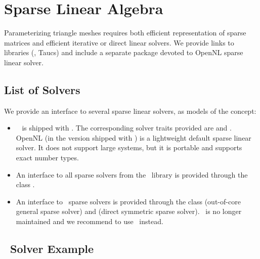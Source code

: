 \section{Sparse Linear Algebra \label{sec:Sparse-Linear-Algebra}}

Parameterizing triangle meshes requires both efficient representation
of sparse matrices and efficient iterative or direct linear
solvers. We provide links to libraries (\eigen, {\sc Taucs})
and include a separate package devoted to OpenNL sparse linear solver.

\subsection{List of Solvers}

We provide an interface to several sparse linear solvers, as models
of the  concept:

\begin{itemize}

\item
    \ccThirdPartyOpenNL\ \cite{cgal:l-nmdgp-05} is shipped with \cgal. The corresponding solver traits
    provided are  and 
    . OpenNL (in the version shipped with \cgal)
    is a lightweight default sparse linear solver. It does not support large systems, but it is portable and
    supports exact number types.

\item
    An interface to all sparse solvers from the \ccThirdPartyEigen\ library is provided through the class
    . 
    


\item
    An interface to \ccThirdPartyTaucs\ sparse solvers is provided through the class 
     (out-of-core general sparse solver) and 
     (direct symmetric sparse solver).
    \ccThirdPartyTaucs\ is no longer maintained and we recommend to use \ccThirdPartyEigen\ instead.\\
\end{itemize}


\subsection{\eigen\ Solver Example}

